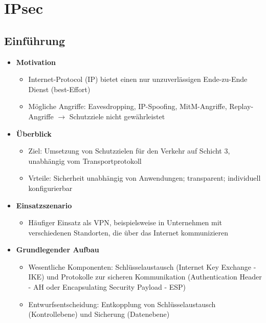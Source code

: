 \section{IPsec}

\subsection{Einführung}
\begin{itemize}
	\item \textbf{Motivation}
	\begin{itemize}
		\item Internet-Protocol (IP) bietet einen nur unzuverlässigen Ende-zu-Ende Dienst (best-Effort)
		\item Mögliche Angriffe: Eavesdropping, IP-Spoofing, MitM-Angriffe, Replay-Angriffe \(\rightarrow\) Schutzziele nicht gewährleistet
	\end{itemize}
	\item \textbf{Überblick}
	\begin{itemize}
		\item Ziel: Umsetzung von Schutzzielen für den Verkehr auf Schicht 3, unabhängig vom Transportprotokoll
		\item Vrteile: Sicherheit unabhängig von Anwendungen; transparent; individuell konfigurierbar
	\end{itemize}
	\item \textbf{Einsatzszenario}
	\begin{itemize}
		\item Häufiger Einsatz als VPN, beispielsweise in Unternehmen mit verschiedenen Standorten, die über das Internet kommunizieren
	\end{itemize}
	\item \textbf{Grundlegender Aufbau}
	\begin{itemize}
		\item Wesentliche Komponenten: Schlüsselaustausch (Internet Key Exchange - IKE) und Protokolle zur sicheren Kommunikation (Authentication Header - AH oder Encapsulating Security Payload - ESP)
		\item Entwurfsentscheidung: Entkopplung von Schlüsselaustausch (Kontrollebene) und Sicherung (Datenebene)
	\end{itemize}
\end{itemize}



